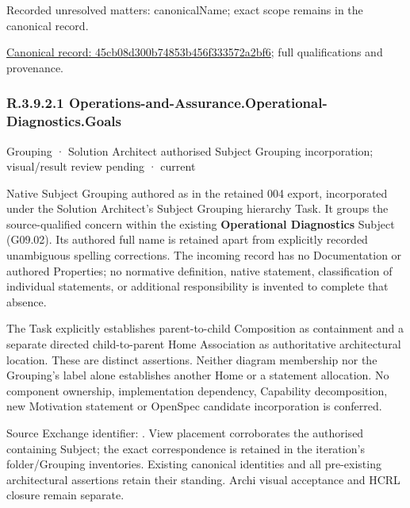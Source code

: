 {\small Recorded unresolved matters: canonicalName; exact scope remains in the canonical record.}\par
{\footnotesize \href{../../../../continuum/grouping/45cb08d300b74853b456f333572a2bf6.md}{Canonical record: 45cb08d300b74853b456f333572a2bf6}; full qualifications and provenance.}\par
\subsubsection*{R.3.9.2.1 Operations-and-Assurance.Operational-Diagnostics.Goals}
\label{navigation:R.3.9.2.1}

\label{element:99436452c53a49b89fa6bc2863557572}
{\small Grouping · Solution Architect authorised Subject Grouping incorporation; visual/result review pending · current}\par

Native Subject Grouping authored as \texttt{} in the retained 004 export,
incorporated under the Solution Architect's Subject Grouping hierarchy Task.
It groups the source-qualified \texttt{} concern within
the existing \textbf{Operational Diagnostics} Subject (G09.02). Its authored full name
is retained apart from explicitly recorded unambiguous spelling corrections.
The incoming record has no Documentation or authored Properties; no normative
definition, native statement, classification of individual statements, or
additional responsibility is invented to complete that absence.



The Task explicitly establishes parent-to-child Composition as containment and
a separate directed child-to-parent Home Association as authoritative architectural
location. These are distinct assertions. Neither diagram membership nor the
Grouping's label alone establishes another Home or a statement allocation.
No component ownership, implementation dependency, Capability decomposition,
new Motivation statement or OpenSpec candidate incorporation is conferred.



Source Exchange identifier: \texttt{}. View placement corroborates
the authorised containing Subject; the exact correspondence is retained in the
iteration's folder/Grouping inventories. Existing canonical identities and all
pre-existing architectural assertions retain their standing. Archi visual
acceptance and HCRL closure remain separate.


